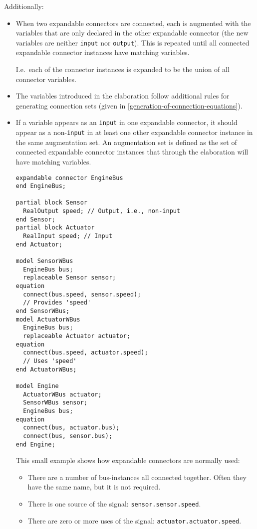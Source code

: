 Additionally:
\begin{itemize}
\item
  When two expandable connectors are connected, each is augmented with the variables that are only declared in the other expandable connector (the new variables are neither \lstinline!input! nor \lstinline!output!).
  This is repeated until all connected expandable connector instances have matching variables.
  \begin{nonnormative}
  I.e.\ each of the connector instances is expanded to be the union of all connector variables.
  \end{nonnormative}

\item
  The variables introduced in the elaboration follow additional rules for generating connection sets (given in \cref{generation-of-connection-equations}).

\item
  If a variable appears as an \lstinline!input! in one expandable connector, it should appear as a non-\lstinline!input! in at least one other expandable connector instance in the same augmentation set.
  An augmentation set is defined as the set of connected expandable connector instances that through the elaboration will have matching variables.
\begin{example}
\begin{lstlisting}[language=modelica]
expandable connector EngineBus
end EngineBus;

partial block Sensor
  RealOutput speed; // Output, i.e., non-input
end Sensor;
partial block Actuator
  RealInput speed; // Input
end Actuator;

model SensorWBus
  EngineBus bus;
  replaceable Sensor sensor;
equation
  connect(bus.speed, sensor.speed);
  // Provides 'speed'
end SensorWBus;
model ActuatorWBus
  EngineBus bus;
  replaceable Actuator actuator;
equation
  connect(bus.speed, actuator.speed);
  // Uses 'speed'
end ActuatorWBus;

model Engine
  ActuatorWBus actuator;
  SensorWBus sensor;
  EngineBus bus;
equation
  connect(bus, actuator.bus);
  connect(bus, sensor.bus);
end Engine;
\end{lstlisting}
This small example shows how expandable connectors are normally used:
\begin{itemize}
\item There are a number of bus-instances all connected together.
Often they have the same name, but it is not required.
\item There is one source of the signal: \lstinline!sensor.sensor.speed!.
\item There are zero or more uses of the signal:  \lstinline!actuator.actuator.speed!.
\end{itemize}
\end{example}


\end{itemize}
